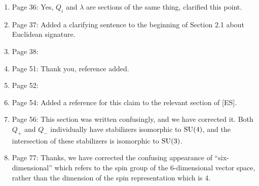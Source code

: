 \documentclass[10pt, oneside]{article}
\begin{document}
\begin{enumerate}
 \item Page 36: Yes, $Q_i$ and $\lambda$ are sections of the same thing, clarified this point. 
 \item Page 37: Added a clarifying sentence to the beginning of Section 2.1 about Euclidean signature.  
 \item Page 38:
 \item Page 51: Thank you, reference added.
 \item Page 52:  
 \item Page 54: Added a reference for this claim to the relevant section of [ES].
 \item Page 56: This section was written confusingly, and we have corrected it.  Both $Q_+$ and $Q_-$ individually have stabilizers isomorphic to $\mathrm{SU}(4)$, and the intersection of these stabilizers is isomorphic to $\mathrm{SU}(3)$.
 \item Page 77: Thanks, we have corrected the confusing appearance of ``six-dimensional'' which refers to the spin group of the 6-dimensional vector space, rather than the dimension of the spin representation which is 4.
\end{enumerate}

 
\end{document}
